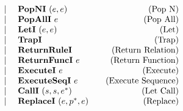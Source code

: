 \begin{align*}
\begin{array}{lcccrlr}
    &&&& | & ~ \textbf{PopNI} ~ (e, e) &\quad\text{(Pop N)} \\
    &&&& | & ~ \textbf{PopAllI} ~ e &\quad\text{(Pop All)} \\
    &&&& | & ~ \textbf{LetI} ~ (e, e) &\quad\text{(Let)} \\
    &&&& | & ~ \textbf{TrapI} &\quad\text{(Trap)} \\
    &&&& | & ~ \textbf{ReturnRuleI} &\quad\text{(Return Relation)} \\
    &&&& | & ~ \textbf{ReturnFuncI} ~ e &\quad\text{(Return Function)} \\
    &&&& | & ~ \textbf{ExecuteI} ~ e &\quad\text{(Execute)} \\
    &&&& | & ~ \textbf{ExecuteSeqI} ~ e &\quad\text{(Execute Sequence)} \\
    &&&& | & ~ \textbf{CallI} ~ (s, s, e^*) &\quad\text{(Let Call)} \\
    &&&& | & ~ \textbf{ReplaceI} ~ (e, p^*, e) &\quad\text{(Replace)} \\
\end{array}
\end{align*}
\newpage
